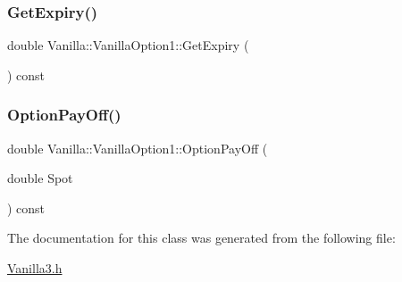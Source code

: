 \subsubsection{\texorpdfstring{Get\+Expiry()}{GetExpiry()}}
{\footnotesize\ttfamily double Vanilla\+::\+Vanilla\+Option1\+::\+Get\+Expiry (\begin{DoxyParamCaption}{ }\end{DoxyParamCaption}) const}

\hypertarget{classVanilla_1_1VanillaOption1_a6af5c93fb6a395dbf329fd17f7bee2ad}{}\label{classVanilla_1_1VanillaOption1_a6af5c93fb6a395dbf329fd17f7bee2ad} 
\subsubsection{\texorpdfstring{Option\+Pay\+Off()}{OptionPayOff()}}
{\footnotesize\ttfamily double Vanilla\+::\+Vanilla\+Option1\+::\+Option\+Pay\+Off (\begin{DoxyParamCaption}\item[{double}]{Spot }\end{DoxyParamCaption}) const}



The documentation for this class was generated from the following file\+:\begin{DoxyCompactItemize}
\item 
\hyperlink{Vanilla3_8h}{Vanilla3.\+h}\end{DoxyCompactItemize}
